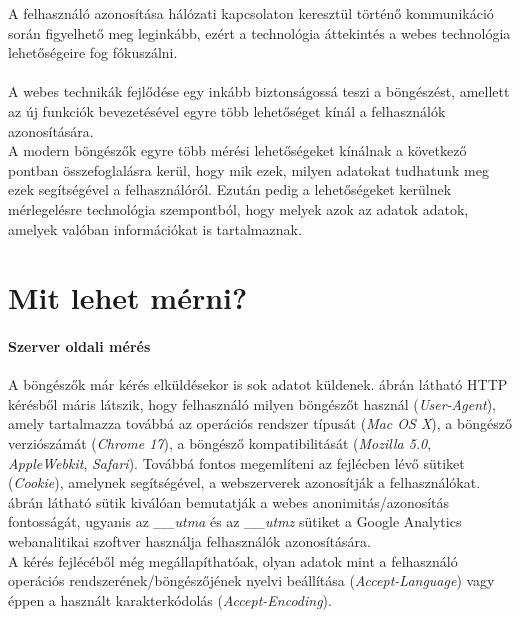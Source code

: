 
A felhasználó azonosítása hálózati kapcsolaton keresztül történő kommunikáció során figyelhető meg leginkább, ezért a technológia áttekintés a webes technológia lehetőségeire fog fókuszálni.\\
\\
A webes technikák fejlődése egy inkább biztonságossá teszi a böngészést, amellett az új funkciók bevezetésével egyre több lehetőséget kínál a felhasználók azonosítására.\\
A modern böngészők egyre több mérési lehetőségeket kínálnak a következő pontban összefoglalásra kerül, hogy mik ezek, milyen adatokat tudhatunk meg ezek segítségével a felhasználóról. Ezután pedig a lehetőségeket kerülnek mérlegelésre technológia szempontból, hogy melyek azok az adatok adatok, amelyek valóban információkat is tartalmaznak.

\section{Mit lehet mérni?} %
\label{sec:miket_tudunk_mérni_}

\paragraph{Szerver oldali mérés} %
\label{par:szerver_oldali_mérés}

A böngészők már kérés elküldésekor is sok adatot küldenek.  ábrán látható HTTP kérésből máris látszik, hogy felhasználó milyen böngészőt használ (\textit{User-Agent}), amely tartalmazza továbbá az operációs rendszer típusát (\textit{Mac OS X}), a böngésző verziószámát (\textit{Chrome 17}), a böngésző kompatibilitását (\textit{Mozilla 5.0}, \textit{AppleWebkit}, \textit{Safari}). Továbbá fontos megemlíteni az fejlécben lévő sütiket (\textit{Cookie}), amelynek segítségével, a webszerverek azonosítják a felhasználókat.\\
 ábrán látható sütik kiválóan bemutatják a webes anonimitás/azonosítás fontosságát, ugyanis az \textit{\_\_utma} és az \textit{\_\_utmz} sütiket a Google Analytics webanalitikai szoftver használja felhasználók azonosítására.\\
A kérés fejlécéből még megállapíthatóak, olyan adatok mint a felhasználó operációs rendszerének/böngészőjének nyelvi beállítása (\textit{Accept-Language}) vagy éppen a használt karakterkódolás (\textit{Accept-Encoding}).\\
\clearpage


